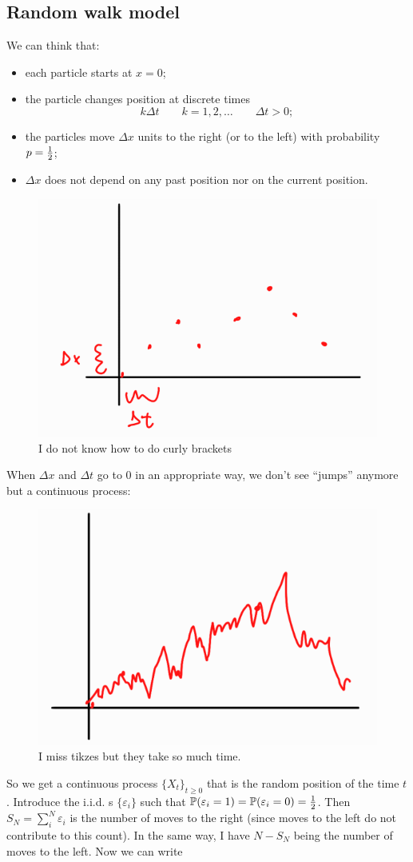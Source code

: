 \documentclass{report}
\begin{document}
\subsection{Random walk model}
We can think that:
\begin{itemize}
	\item each particle starts at $x=0$;
	\item the particle changes position at discrete times
	\begin{equation*}
		k\Delta t \qquad k=1,2,\ldots\qquad\Delta t>0;
	\end{equation*}
	\item the particles move $\Delta x$ units to the right (or to the left) with probability $p=\frac{1}{2}$;
	\item $\Delta x$ does not depend on any past position nor on the current position. 
\end{itemize}
\begin{figure}[h]
	\centering
	\includegraphics[width=0.5\linewidth]{img/screenshot008}
	\caption{I do not know how to do curly brackets}
	\label{fig:screenshot008}
\end{figure}
When $\Delta x$ and $\Delta t$ go to 0 in an appropriate way, we don't see ``jumps'' anymore but a continuous process:
\begin{figure}[h]
	\centering
	\includegraphics[width=0.5\linewidth]{img/screenshot009}
	\caption{I miss tikzes but they take so much time.}
	\label{fig:screenshot009}
\end{figure}
So we get a continuous process ${\{X_{t}\}}_{t\geq0}$ that is the random position of the time $t$. Introduce the i.i.d. \rv s $\{\varepsilon_{i}\}$ such that $\mathbb{P}(\varepsilon_{i}=1)=\mathbb{P}(\varepsilon_{i}=0)=\frac{1}{2}$. Then $S_{N}=\sum_{i}^{N}\varepsilon_{i}$ is the number of moves to the right (since moves to the left do not contribute to this count). In the same way, I have $N-S_{N}$ being the number of moves to the left. Now we can write
\end{document}
